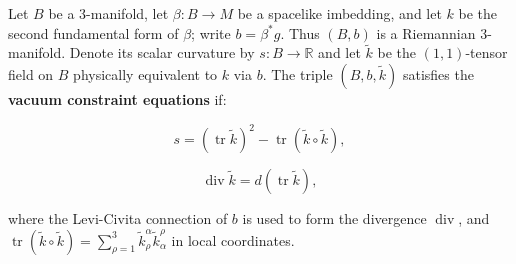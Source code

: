 Let $B$ be a 3-manifold, let $\beta: B \rightarrow M$ be a spacelike imbedding, and let $k$ be the second fundamental form of $\beta$; write $b = \beta^* g$. Thus $(B, b)$ is a Riemannian 3-manifold. Denote its scalar curvature by $s: B \rightarrow \mathbb{R}$ and let $\tilde{k}$ be the $(1, 1)$-tensor field on $B$ physically equivalent to $k$ via $b$. The triple $(B, b, \tilde{k})$ satisfies the \textbf{vacuum constraint equations} if:

$$
s = (\operatorname{tr} \tilde{k})^2 - \operatorname{tr}(\tilde{k} \circ \tilde{k}),
$$

$$
\operatorname{div} \tilde{k} = d(\operatorname{tr} \tilde{k}),
$$

where the Levi-Civita connection of $b$ is used to form the divergence $\operatorname{div}$, and $\operatorname{tr}(\tilde{k} \circ \tilde{k}) = \sum_{\rho=1}^{3} \tilde{k}_{\rho}^{\alpha} \tilde{k}_{\alpha}^{\rho}$ in local coordinates.
